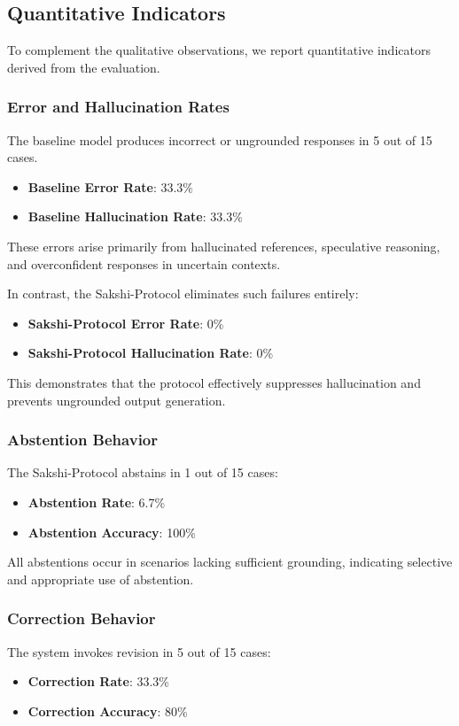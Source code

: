 \documentclass[12pt,a4paper]{article}
\begin{document}
\subsection{Quantitative Indicators}
To complement the qualitative observations, we report quantitative indicators derived from the evaluation.
\subsubsection*{Error and Hallucination Rates}
The baseline model produces incorrect or ungrounded responses in 5 out of 15 cases.
\begin{itemize}
    \item \textbf{Baseline Error Rate}: 33.3\%
    \item \textbf{Baseline Hallucination Rate}: 33.3\%
\end{itemize}
These errors arise primarily from hallucinated references, speculative reasoning, and overconfident responses in uncertain contexts.

In contrast, the Sakshi-Protocol eliminates such failures entirely:
\begin{itemize}
    \item \textbf{Sakshi-Protocol Error Rate}: 0\%
    \item \textbf{Sakshi-Protocol Hallucination Rate}: 0\%
\end{itemize}
This demonstrates that the protocol effectively suppresses hallucination and prevents ungrounded output generation.

\subsubsection*{Abstention Behavior}
The Sakshi-Protocol abstains in 1 out of 15 cases:
\begin{itemize}
    \item \textbf{Abstention Rate}: 6.7\%
    \item \textbf{Abstention Accuracy}: 100\%
\end{itemize}
All abstentions occur in scenarios lacking sufficient grounding, indicating selective and appropriate use of abstention.

\subsubsection*{Correction Behavior}
The system invokes revision in 5 out of 15 cases:
\begin{itemize}
    \item \textbf{Correction Rate}: 33.3\%
    \item \textbf{Correction Accuracy}: 80\%
\end{itemize}
\end{document}
